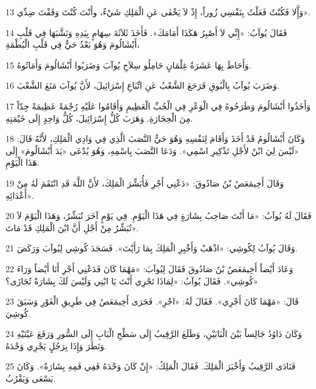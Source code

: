 \par 13 وَإَِّلا فَكُنْتُ فَعَلْتُ بِنَفْسِي زُوراً، إِذْ لاَ يَخْفَى عَنِ الْمَلِكِ شَيْءٌ، وأَنْتَ كُنْتَ وَقَفْتَ ضِدِّي».
\par 14 فَقَالَ يُوآبُ: «إِنِّي لاَ أَصْبِرُ هَكَذَا أَمَامَكَ». فَأَخَذَ ثَلاَثَةَ سِهَامٍ بِيَدِهِ وَنَشَّبَهَا فِي قَلْبِ أَبْشَالُومَ وَهُوَ بَعْدُ حَيٌّ فِي قَلْبِ الْبُطْمَةِ،
\par 15 وَأَحَاطَ بِهَا عَشَرَةُ غِلْمَانٍ حَامِلُو سِلاَحِ يُوآبَ وَضَرَبُوا أَبْشَالُومَ وَأَمَاتُوهُ.
\par 16 وَضَرَبَ يُوآبُ بِالْبُوقِ فَرَجَعَ الشَّعْبُ عَنِ اتِّبَاعِ إِسْرَائِيلَ، لأَنَّ يُوآبَ مَنَعَ الشَّعْبَ.
\par 17 وَأَخَذُوا أَبْشَالُومَ وَطَرَحُوهُ فِي الْوَعْرِ فِي الْجُبِّ الْعَظِيمِ وَأَقَامُوا عَلَيْهِ رُجْمَةً عَظِيمَةً جِدّاً مِنَ الْحِجَارَةِ. وَهَرَبَ كُلُّ إِسْرَائِيلَ، كُلُّ وَاحِدٍ إِلَى خَيْمَتِهِ.
\par 18 وَكَانَ أَبْشَالُومُ قَدْ أَخَذَ وَأَقَامَ لِنَفْسِهِ وَهُوَ حَيٌّ النَّصَبَ الَّذِي فِي وَادِي الْمَلِكِ، لأَنَّهُ قَالَ: «لَيْسَ لِيَ ابْنٌ لأَجْلِ تَذْكِيرِ اسْمِي». وَدَعَا النَّصَبَ بِاسْمِهِ، وَهُوَ يُدْعَى «يَدَ أَبْشَالُومَ» إِلَى هَذَا الْيَوْمِ.
\par 19 وَقَالَ أَخِيمَعَصُ بْنُ صَادُوقَ: «دَعْنِي أَجْرِ فَأُبَشِّرَ الْمَلِكَ، لأَنَّ اللَّهَ قَدِ انْتَقَمَ لَهُ مِنْ أَعْدَائِهِ».
\par 20 فَقَالَ لَهُ يُوآبُ: «مَا أَنْتَ صَاحِبُ بِشَارَةٍ فِي هَذَا الْيَوْمِ. فِي يَوْمٍ آخَرَ تُبَشِّرُ، وَهَذَا الْيَوْمَ لاَ تُبَشِّرُ مِنْ أَجْلِ أَنَّ ابْنَ الْمَلِكِ قَدْ مَاتَ».
\par 21 وَقَالَ يُوآبُ لِكُوشِي: «اذْهَبْ وَأَخْبِرِ الْمَلِكَ بِمَا رَأَيْتَ». فَسَجَدَ كُوشِي لِيُوآبَ وَرَكَضَ.
\par 22 وَعَادَ أَيْضاً أَخِيمَعَصُ بْنُ صَادُوقَ فَقَالَ لِيُوآبَ: «مَهْمَا كَانَ فَدَعْنِي أَجْرِ أَنَا أَيْضاً وَرَاءَ كُوشِي». فَقَالَ يُوآبُ: «لِمَاذَا تَجْرِي أَنْتَ يَا ابْنِي وَلَيْسَ لَكَ بِشَارَةٌ تُجَازَى؟»
\par 23 قَالَ: «مَهْمَا كَانَ أَجْرِي». فَقَالَ لَهُ: «اجْرِ». فَجَرَى أَخِيمَعَصُ فِي طَرِيقِ الْغَوْرِ وَسَبَقَ كُوشِيَ.
\par 24 وَكَانَ دَاوُدُ جَالِساً بَيْنَ الْبَابَيْنِ، وَطَلَعَ الرَّقِيبُ إِلَى سَطْحِ الْبَابِ إِلَى السُّورِ وَرَفَعَ عَيْنَيْهِ وَنَظَرَ وَإِذَا بِرَجُلٍ يَجْرِي وَحْدَهُ.
\par 25 فَنَادَى الرَّقِيبُ وَأَخْبَرَ الْمَلِكَ. فَقَالَ الْمَلِكُ: «إِنْ كَانَ وَحْدَهُ فَفِي فَمِهِ بِشَارَةٌ». وَكَانَ يَسْعَى وَيَقْرُبُ.
